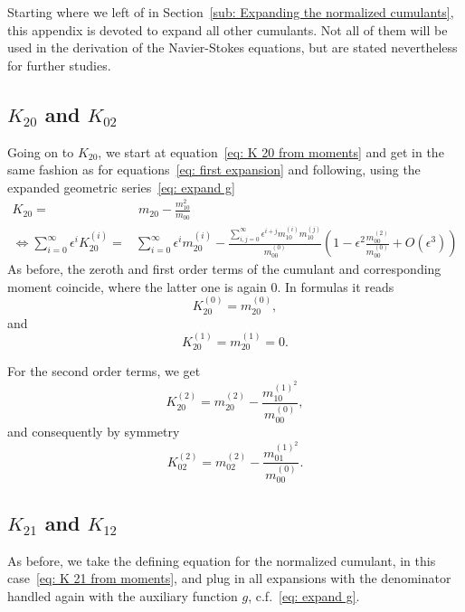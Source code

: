 Starting where we left of in Section~\eqref{sub: Expanding the normalized cumulants}, this appendix is devoted to expand all other cumulants.
Not all of them will be used in the derivation of the Navier-Stokes equations, but are stated nevertheless for further studies.

\subsection{\texorpdfstring{$K_{20}$}{K 20} and \texorpdfstring{$K_{02}$}{K 02}}
\label{sub: K 20}
Going on to $K_{20}$, we start at equation~\eqref{eq: K 20 from moments} and get in the same fashion as for equations~\eqref{eq: first expansion} and following, using the expanded geometric series~\eqref{eq: expand g}
\begin{equation*}
  \begin{aligned}
    K_{20}  = &\ m_{20} - \frac{m_{10}^2}{m_{00}}\\
    \Leftrightarrow
    \sum_{i=0}^\infty \epsilon^i K_{20}^{(i)}
    =& \sum_{i=0}^\infty \epsilon^i m_{20}^{(i)}
    - \frac{\sum_{i,j=0}^\infty \epsilon^{i+j} m_{10}^{(i)}m_{10}^{(j)}}
        {m_{00}^{(0)}}
    \left(1 - \epsilon^2 \frac{m_{00}^{(2)}}{m_{00}^{(0)}}  + O(\epsilon^3)\right)
  \end{aligned}
\end{equation*}
As before, the zeroth and first order terms of the cumulant and corresponding moment coincide, where the latter one is again $0$. In formulas it reads
\begin{equation*}
  K_{20}^{(0)} = m_{20}^{(0)},
\end{equation*}
and
\begin{equation*}
  K_{20}^{(1)} = m_{20}^{(1)} = 0.
\end{equation*}

For the second order terms, we get
\begin{equation*}
  K_{20}^{(2)} = m_{20}^{(2)} - \frac{ m_{10}^{{(1)}^2}}{m_{00}^{(0)}},
\end{equation*}
and consequently by symmetry
\begin{equation*}
  K_{02}^{(2)} = m_{02}^{(2)} - \frac{ m_{01}^{{(1)}^2}}{m_{00}^{(0)}}.
\end{equation*}

\subsection{\texorpdfstring{$K_{21}$}{K 21} and \texorpdfstring{$K_{12}$}{K 12}}
\label{sub: K 21}
As before, we take the defining equation for the normalized cumulant, in this case~\eqref{eq: K 21 from moments}, and plug in all expansions with the denominator handled again with the auxiliary function $g$, c.f.~\eqref{eq: expand g}.

